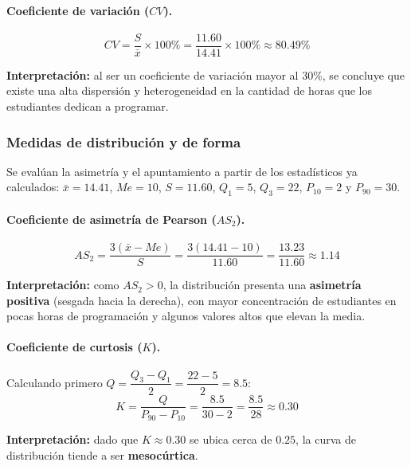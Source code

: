 \documentclass[12pt,letterpaper]{article}
\begin{document}
\paragraph{Coeficiente de variación ($CV$).}
$$CV = \frac{S}{\bar{x}} \times 100\% = \frac{11.60}{14.41} \times 100\% \approx 80.49\%$$

\noindent\textbf{Interpretación:} al ser un coeficiente de variación mayor al 30\%, se concluye que existe una alta dispersión y heterogeneidad en la cantidad de horas que los estudiantes dedican a programar.

\subsubsection{Medidas de distribución y de forma}

Se evalúan la asimetría y el apuntamiento a partir de los estadísticos ya calculados: $\bar{x} = 14.41$, $Me = 10$, $S = 11.60$, $Q_1 = 5$, $Q_3 = 22$, $P_{10} = 2$ y $P_{90} = 30$.

\paragraph{Coeficiente de asimetría de Pearson ($AS_2$).}
$$AS_2 = \frac{3(\bar{x} - Me)}{S} = \frac{3(14.41 - 10)}{11.60} = \frac{13.23}{11.60} \approx 1.14$$

\noindent\textbf{Interpretación:} como $AS_2 > 0$, la distribución presenta una \textbf{asimetría positiva} (sesgada hacia la derecha), con mayor concentración de estudiantes en pocas horas de programación y algunos valores altos que elevan la media.

\paragraph{Coeficiente de curtosis ($K$).}
Calculando primero $Q = \dfrac{Q_3 - Q_1}{2} = \dfrac{22 - 5}{2} = 8.5$:
$$K = \frac{Q}{P_{90} - P_{10}} = \frac{8.5}{30 - 2} = \frac{8.5}{28} \approx 0.30$$

\noindent\textbf{Interpretación:} dado que $K \approx 0.30$ se ubica cerca de $0.25$, la curva de distribución tiende a ser \textbf{mesocúrtica}.

\clearpage
\end{document}
